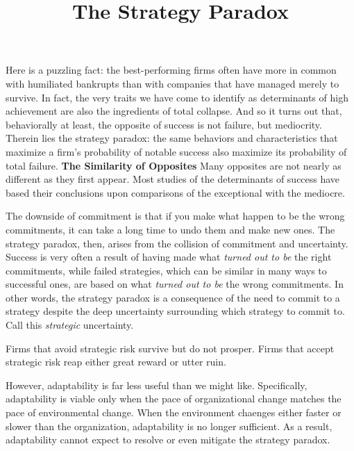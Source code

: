 \documentclass[ebook,12pt,oneside,openany]{memoir}
\begin{document}
\title{The Strategy Paradox}
\maketitle

Here is a puzzling fact: the best-performing firms often have more in common with humiliated bankrupts than with companies that have managed merely to survive.
In fact, the very traits we have come to identify as determinants of high achievement are also the ingredients of total collapse. 
And so it turns out that, behaviorally at least, the opposite of success is not failure, but mediocrity.
Therein lies the strategy paradox: the same behaviors and characteristics that maximize a firm's probability of notable success also maximize its probability of total failure.
\textbf{The Similarity of Opposites} Many opposites are not nearly as different as they first appear. 
Most studies of the determinants of success have based their conclusions upon comparisons of the exceptional with the mediocre.

The downside of commitment is that if you make what happen to be the wrong commitments, it can take a long time to undo them and make new ones.
The strategy paradox, then, arises from the collision of commitment and uncertainty.
Success is very often a result of having made what \textit{turned out to be} the right commitments, while failed strategies, which can be similar in many ways to successful ones, are based on what \textit{turned out to be} the wrong commitments.
In other words, the strategy paradox is a consequence of the need to commit to a strategy despite the deep uncertainty surrounding which strategy to commit to. Call this \textit{strategic} uncertainty.

Firms that avoid strategic risk survive but do not prosper. Firms that accept strategic risk reap either great reward or utter ruin. 

However, adaptability is far less useful than we might like. Specifically, adaptability is viable only when the pace of organizational change matches the pace of environmental change.
When the environment chaenges either faster or slower than the organization, adaptability is no longer sufficient. 
As a result, adaptability cannot expect to resolve or even mitigate the strategy paradox.
\end{document}

